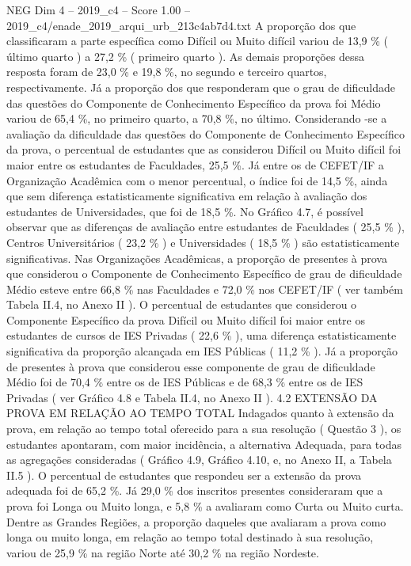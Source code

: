 \begin{textsample}{NEG Dim 4 – 2019\_c4 – Score 1.00 – 2019\_c4/enade\_2019\_arqui\_urb\_213c4ab7d4.txt}
A proporção dos que classificaram a parte específica como Difícil ou Muito difícil variou de 13,9 \% ( último quarto ) a 27,2 \% ( primeiro quarto ).
As demais proporções dessa resposta foram de 23,0 \% e 19,8 \%, no segundo e terceiro quartos, respectivamente.
Já a proporção dos que responderam que o grau de dificuldade das questões do Componente de Conhecimento Específico da prova foi Médio variou de 65,4 \%, no primeiro quarto, a 70,8 \%, no último.
Considerando -se a avaliação da dificuldade das questões do Componente de Conhecimento Específico da prova, o percentual de estudantes que as considerou Difícil ou Muito difícil foi maior entre os estudantes de Faculdades, 25,5 \%.
Já entre os de CEFET/IF a Organização Acadêmica com o menor percentual, o índice foi de 14,5 \%, ainda que sem diferença estatisticamente significativa em relação à avaliação dos estudantes de Universidades, que foi de 18,5 \%.
No Gráfico 4.7, é possível observar que as diferenças de avaliação entre estudantes de Faculdades ( 25,5 \% ), Centros Universitários ( 23,2 \% ) e Universidades ( 18,5 \% ) são estatisticamente significativas.
Nas Organizações Acadêmicas, a proporção de presentes à prova que considerou o Componente de Conhecimento Específico de grau de dificuldade Médio esteve entre 66,8 \% nas Faculdades e 72,0 \% nos CEFET/IF ( ver também Tabela II.4, no Anexo II ).
O percentual de estudantes que considerou o Componente Específico da prova Difícil ou Muito difícil foi maior entre os estudantes de cursos de IES Privadas ( 22,6 \% ), uma diferença estatisticamente significativa da proporção alcançada em IES Públicas ( 11,2 \% ).
Já a proporção de presentes à prova que considerou esse componente de grau de dificuldade Médio foi de 70,4 \% entre os de IES Públicas e de 68,3 \% entre os de IES Privadas ( ver Gráfico 4.8 e Tabela II.4, no Anexo II ). 4.2 EXTENSÃO DA PROVA EM RELAÇÃO AO TEMPO TOTAL Indagados quanto à extensão da prova, em relação ao tempo total oferecido para a sua resolução ( Questão 3 ), os estudantes apontaram, com maior incidência, a alternativa Adequada, para todas as agregações consideradas ( Gráfico 4.9, Gráfico 4.10, e, no Anexo II, a Tabela II.5 ).
O percentual de estudantes que respondeu ser a extensão da prova adequada foi de 65,2 \%.
Já 29,0 \% dos inscritos presentes consideraram que a prova foi Longa ou Muito longa, e 5,8 \% a avaliaram como Curta ou Muito curta.
Dentre as Grandes Regiões, a proporção daqueles que avaliaram a prova como longa ou muito longa, em relação ao tempo total destinado à sua resolução, variou de 25,9 \% na região Norte até 30,2 \% na região Nordeste.

\end{textsample}

